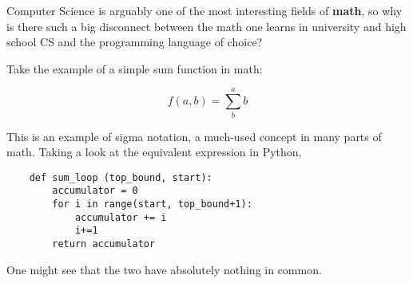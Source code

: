 \documentclass[../main.tex]{subfiles}
\begin{document}
Computer Science is arguably one of the most interesting fields of \textbf{math}, so why is there such a big disconnect between the math one learns in university and high school CS and the programming language of choice?

Take the example of a simple sum function in math:

\[ f(a, b) = \sum^a_{b} b \]

This is an example of sigma notation, a much-used concept in many parts of math. Taking a look at the equivalent expression in Python,

\begin{verbatim}
    def sum_loop (top_bound, start):
        accumulator = 0
        for i in range(start, top_bound+1):
            accumulator += i
            i+=1
        return accumulator
\end{verbatim}

One might see that the two have absolutely nothing in common.
\end{document}
